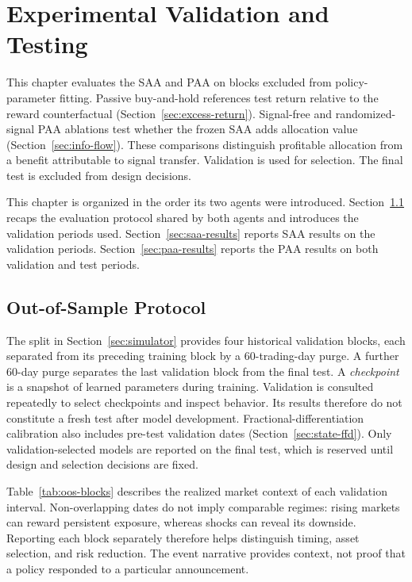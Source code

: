 \section{Experimental Validation and Testing}
\label{sec:validation}

This chapter evaluates the SAA and PAA on blocks excluded from policy-parameter fitting. Passive buy-and-hold references test return relative to the reward counterfactual (Section~\ref{sec:excess-return}). Signal-free and randomized-signal PAA ablations test whether the frozen SAA adds allocation value (Section~\ref{sec:info-flow}). These comparisons distinguish profitable allocation from a benefit attributable to signal transfer. Validation is used for selection. The final test is excluded from design decisions.

This chapter is organized in the order its two agents were introduced. Section~\ref{sec:oos-protocol} recaps the evaluation protocol shared by both agents and introduces the validation periods used. Section~\ref{sec:saa-results} reports SAA results on the validation periods. Section~\ref{sec:paa-results} reports the PAA results on both validation and test periods.

\subsection{Out-of-Sample Protocol}
\label{sec:oos-protocol}

The split in Section~\ref{sec:simulator} provides four historical validation blocks, each separated from its preceding training block by a 60-trading-day purge. A further 60-day purge separates the last validation block from the final test. A \emph{checkpoint} is a snapshot of learned parameters during training. Validation is consulted repeatedly to select checkpoints and inspect behavior. Its results therefore do not constitute a fresh test after model development. Fractional-differentiation calibration also includes pre-test validation dates (Section~\ref{sec:state-ffd}). Only validation-selected models are reported on the final test, which is reserved until design and selection decisions are fixed.


Table~\ref{tab:oos-blocks} describes the realized market context of each validation interval. Non-overlapping dates do not imply comparable regimes: rising markets can reward persistent exposure, whereas shocks can reveal its downside. Reporting each block separately therefore helps distinguish timing, asset selection, and risk reduction. The event narrative provides context, not proof that a policy responded to a particular announcement.

